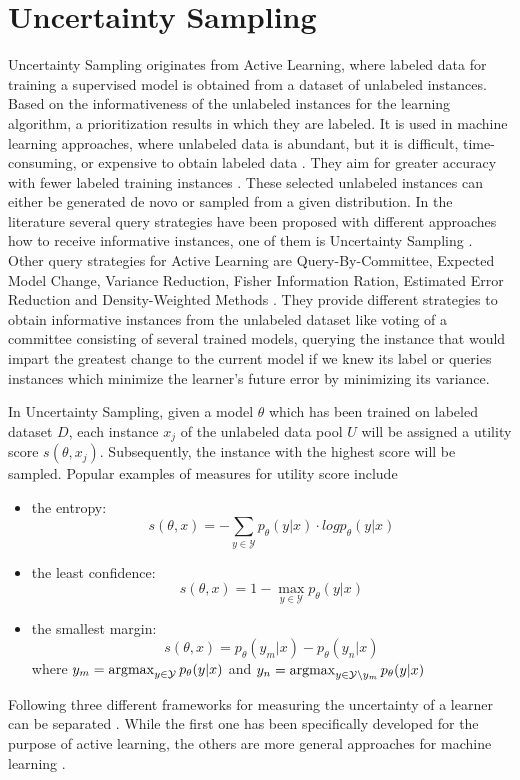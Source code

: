 \section{Uncertainty Sampling} \label{sec:uncertaintysampling}
Uncertainty Sampling originates from Active Learning, 
where labeled data for training a supervised model is obtained from a dataset of unlabeled instances.
Based on the informativeness of the unlabeled instances for the learning algorithm, a prioritization results in which they are labeled.
It is used in machine learning approaches, where unlabeled data is abundant, but it is difficult, time-consuming, or expensive to obtain labeled data \cite{Settles2009ActiveLL}.
They aim for greater accuracy with fewer labeled training instances \cite{Settles2009ActiveLL}.
These selected unlabeled instances can either be generated de novo or sampled from a given distribution.
In the literature several query strategies have been proposed with different approaches how to receive informative instances, one of them is Uncertainty Sampling \cite{Settles2009ActiveLL}.
Other query strategies for Active Learning are Query-By-Committee, Expected Model Change, Variance Reduction, Fisher Information Ration, Estimated Error Reduction and Density-Weighted Methods \cite{Settles2009ActiveLL}.
They provide different strategies to obtain informative instances from the unlabeled dataset like voting of a committee consisting of several trained models, querying the instance that would impart the greatest change to the current model if we knew its label or queries instances which minimize the learner’s future error by minimizing its variance.

In Uncertainty Sampling, given a model $\theta$ which has been trained on labeled dataset $D$, each instance $x_j$ of the unlabeled data pool $U$ will be assigned a utility score $s(\theta, x_j)$.
Subsequently, the instance with the highest score will be sampled.
Popular examples of measures for utility score include
\begin{itemize}
    \item the entropy:
     $$s(\theta, x) = - \sum_{y \in \mathcal{Y}}{p_{\theta}(y | x) \cdot log p_{\theta}(y|x)}$$

    \item the least confidence:
    $$s(\theta, x) = 1 - \max_{y \in \mathcal{Y}}{p_{\theta}(y | x)}$$
    
    \item the smallest margin:
    $$s(\theta, x) = p_{\theta}(y_m | x) - p_{\theta}(y_n|x)$$
    where
    $y_m = \operatorname*{argmax}_{y \in \mathcal{Y}} p_{\theta}(y | x)$ 
    and 
    $y_n = \operatorname*{argmax}_{y \in \mathcal{Y} \setminus y_m}{p_{\theta}(y | x)}$
\end{itemize}
Following three different frameworks for measuring the  uncertainty of a learner can be separated \cite{nguyen2021howtomeasure}.
While the first one has been specifically developed for the purpose of active learning, the others are more general approaches for machine learning \cite{nguyen2021howtomeasure}.

